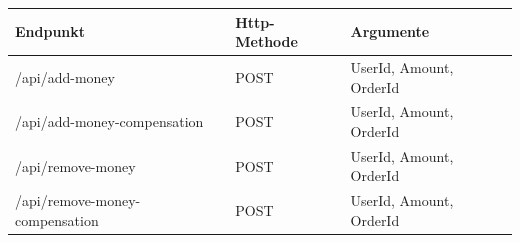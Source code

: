 \begin{center}
	\begin{tabular}[h]{|l|l|l|}
		\hline
		Endpunkt & Http-Methode & Argumente \\ \hline
		/api/add-money & POST & UserId, Amount, OrderId \\ \hline
		/api/add-money-compensation & POST & UserId, Amount, OrderId \\ \hline
		/api/remove-money & POST & UserId, Amount, OrderId \\ \hline
		/api/remove-money-compensation & POST & UserId, Amount, OrderId \\ \hline 
	\end{tabular}
\end{center}
\FloatBarrier